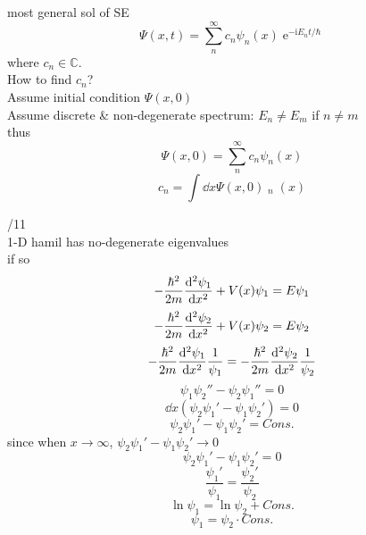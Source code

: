 \documentclass[UTF8]{ctexart} %
\DeclareMathOperator{\e}{\mathrm{e}}
\renewcommand{\I}{\mathrm{i}}
\DeclareMathOperator{\ra}{\rightarrow}
\DeclareMathOperator{\psis}{\psi^\ast}
\numberwithin{equation}{subsection}
\begin{document}
most general sol of SE
\begin{equation}\label{key}
\Psi(x,t) = \sum_n^\infty c_n\psi_n(x)\e^{-\I E_n t/\hbar}
\end{equation}
where $ c_n \in \mathbb{C}$.\\
How to find $ c_n $?\\
Assume initial condition $ \Psi(x,0) $\\
Assume discrete \& non-degenerate spectrum: $ E_n \neq E_m $ if $ n\neq m $\\
thus
\begin{equation}\label{key}
\Psi(x,0) = \sum_n^\infty c_n\psi_n(x)
\end{equation}
\begin{equation}\label{key}
c_n = \int\dd x \Psi(x,0)\psis_n(x)
\end{equation}

/11\\
1-D hamil has no-degenerate eigenvalues\\
if so
\begin{equation}\label{key}
-\dfrac{\hbar^2}{2m}\dv[2]{\psi_1}{x} + V(x)\psi_1 = E\psi_1
\end{equation}
\begin{equation}\label{key}
-\dfrac{\hbar^2}{2m}\dv[2]{\psi_2}{x} + V(x)\psi_2 = E\psi_2
\end{equation}
\begin{equation}\label{key}
-\dfrac{\hbar^2}{2m}\dv[2]{\psi_1}{x}\dfrac{1}{\psi_1} = -\dfrac{\hbar^2}{2m}\dv[2]{\psi_2}{x}\dfrac{1}{\psi_2}
\end{equation}
\begin{equation}\label{key}
\psi_1\psi_2'' - \psi_2\psi_1'' = 0
\end{equation}
\begin{equation}\label{key}
\dd{x}(\psi_2\psi_1' - \psi_1\psi_2') = 0
\end{equation}
\begin{equation}\label{key}
\psi_2\psi_1' - \psi_1\psi_2' = Cons.
\end{equation}
since when $ x\ra\infty $, $ \psi_2\psi_1' - \psi_1\psi_2' \ra 0 $
\begin{equation}\label{key}
\psi_2\psi_1' - \psi_1\psi_2' = 0
\end{equation}
\begin{equation}\label{key}
\dfrac{\psi_1'}{\psi_1} = \dfrac{\psi_2'}{\psi_2}
\end{equation}
\begin{equation}\label{key}
\ln\psi_1 = \ln\psi_2 + Cons.
\end{equation}
\begin{equation}\label{key}
\psi_1 = \psi_2\cdot Cons.
\end{equation}
\end{document}
